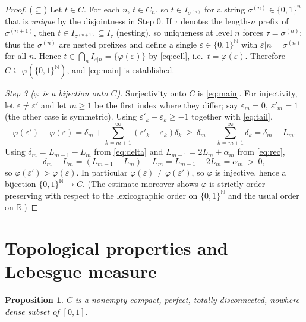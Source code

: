 \documentclass{amsart}
\newtheorem{proposition}{Proposition}
\theoremstyle{definition}
\theoremstyle{remark}
\begin{document}
\begin{proof}
($\subseteq$) Let $t\in C$. For each $n$, $t\in C_n$, so $t\in I_{\sigma^{(n)}}$
for a string $\sigma^{(n)}\in\{0,1\}^n$ that is \emph{unique} by the disjointness
in Step 0. If $\tau$ denotes the length-$n$ prefix of $\sigma^{(n+1)}$, then
$t\in I_{\sigma^{(n+1)}}\subseteq I_\tau$ (nesting), so uniqueness at level $n$
forces $\tau=\sigma^{(n)}$; thus the $\sigma^{(n)}$ are nested prefixes and define
a single $\varepsilon\in\{0,1\}^{\mathbb N}$ with $\varepsilon|n=\sigma^{(n)}$ for
all $n$. Hence $t\in\bigcap_n I_{\varepsilon|n}=\{\varphi(\varepsilon)\}$ by
\eqref{eq:cell}, i.e.\ $t=\varphi(\varepsilon)$. Therefore $C\subseteq
\varphi(\{0,1\}^{\mathbb N})$, and \eqref{eq:main} is established.

\smallskip
\emph{Step 3 ($\varphi$ is a bijection onto $C$).}
Surjectivity onto $C$ is \eqref{eq:main}. For injectivity, let
$\varepsilon\ne\varepsilon'$ and let $m\ge1$ be the first index where they differ;
say $\varepsilon_m=0,\ \varepsilon'_m=1$ (the other case is symmetric). Using
$\varepsilon'_k-\varepsilon_k\ge-1$ together with \eqref{eq:tail},
\[
\varphi(\varepsilon')-\varphi(\varepsilon)
=\delta_m+\sum_{k=m+1}^{\infty}(\varepsilon'_k-\varepsilon_k)\delta_k
\ \ge\ \delta_m-\sum_{k=m+1}^{\infty}\delta_k
=\delta_m-L_m .
\]
Using $\delta_m=L_{m-1}-L_m$ from \eqref{eq:delta} and $L_{m-1}=2L_m+\alpha_m$ from
\eqref{eq:rec},
\[
\delta_m-L_m=(L_{m-1}-L_m)-L_m=L_{m-1}-2L_m=\alpha_m\ >\ 0,
\]
so $\varphi(\varepsilon')>\varphi(\varepsilon)$. In particular
$\varphi(\varepsilon)\ne\varphi(\varepsilon')$, so $\varphi$ is injective, hence a
bijection $\{0,1\}^{\mathbb N}\to C$. (The estimate moreover shows $\varphi$ is
strictly order preserving with respect to the lexicographic order on
$\{0,1\}^{\mathbb N}$ and the usual order on $\mathbb R$.)
\end{proof}

\section{Topological properties and Lebesgue measure}

\begin{proposition}\label{prop:topo}
$C$ is a nonempty compact, perfect, totally disconnected, nowhere dense subset of
$[0,1]$.
\end{proposition}
\end{document}
